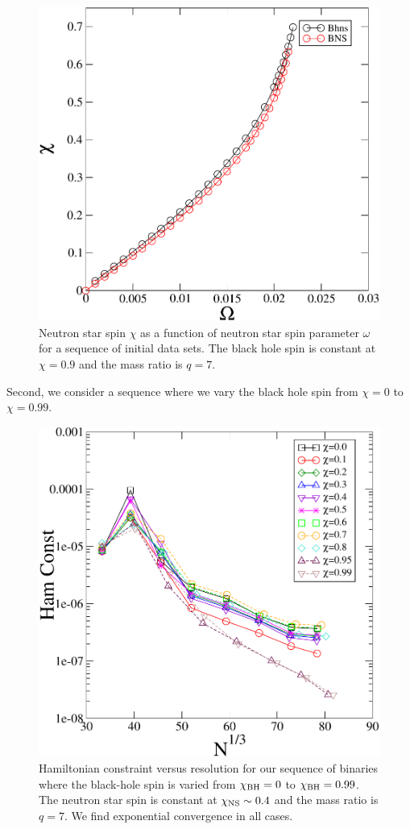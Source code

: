 \begin{figure}
\includegraphics[width=0.95\columnwidth]{chap4/chiVOmega}
\caption[]{\label{fig:ChiVOmega}
Neutron star spin $\chi$ as a function of neutron star spin parameter
$\omega$ for a sequence of initial data sets. The black hole spin is
constant at $\chi=0.9$ and the mass ratio is $q=7$. }
\end{figure}

Second, we consider a sequence where we vary the black hole spin from 
$\chi=0$ to $\chi=0.99$. 
\begin{figure}
\includegraphics[width=0.95\columnwidth]{chap4/chiSeqHam}
\caption[]{\label{fig:chiSeqHam}Hamiltonian constraint versus resolution for our sequence of binaries where the black-hole spin is varied from $\chi_{\rm BH}=0$ to $\chi_{\rm BH}=0.99$. The neutron star spin is constant at $\chi_{\rm NS}\sim 0.4$ and the mass ratio is $q=7$. We find exponential convergence in all cases.}
\end{figure}

